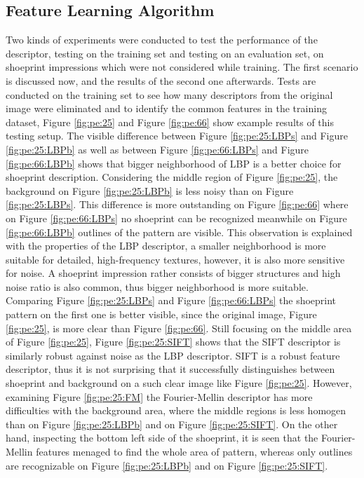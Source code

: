 \documentclass[draft,final]{vutinfth} %
\begin{document}
\subsection{Feature Learning Algorithm}
\par
Two kinds of experiments were conducted to test the performance of the descriptor, testing on the training set and testing on an evaluation set, on shoeprint impressions which were not considered while training.
The first scenario is discussed now, and the results of the second one afterwards.
Tests are conducted on the training set to see how many descriptors from the original image were eliminated and to identify the common features in the training dataset, Figure \ref{fig:pe:25} and Figure \ref{fig:pe:66} show example results of this testing setup.
The visible difference between Figure \ref{fig:pe:25:LBPs} and Figure \ref{fig:pe:25:LBPb} as well as between Figure \ref{fig:pe:66:LBPs} and Figure \ref{fig:pe:66:LBPb} shows that bigger neighborhood of LBP is a better choice for shoeprint description.
Considering the middle region of Figure \ref{fig:pe:25}, the background on Figure \ref{fig:pe:25:LBPb} is less noisy than on Figure \ref{fig:pe:25:LBPs}.
This difference is more outstanding on  Figure \ref{fig:pe:66} where on Figure \ref{fig:pe:66:LBPs} no shoeprint can be recognized meanwhile on Figure \ref{fig:pe:66:LBPb} outlines of the pattern are visible.
This observation is explained with the properties of the LBP descriptor, a smaller neighborhood is more suitable for detailed, high-frequency textures, however, it is also more sensitive for noise.
A shoeprint impression rather consists of bigger structures and high noise ratio is also common, thus bigger neighborhood is more suitable.
Comparing Figure \ref{fig:pe:25:LBPs} and Figure \ref{fig:pe:66:LBPs} the shoeprint pattern on the first one is better visible, since the original image, Figure \ref{fig:pe:25}, is more clear than Figure \ref{fig:pe:66}.
Still focusing on the middle area of Figure \ref{fig:pe:25}, Figure \ref{fig:pe:25:SIFT} shows that the SIFT descriptor is similarly robust against noise as the LBP descriptor.
SIFT is a robust feature descriptor, thus it is not surprising that it successfully distinguishes between shoeprint and background on a such clear image like Figure \ref{fig:pe:25}.
However, examining Figure  \ref{fig:pe:25:FM} the Fourier-Mellin descriptor has more difficulties with the background area, where the middle regions is less homogen than on  Figure \ref{fig:pe:25:LBPb} and on Figure \ref{fig:pe:25:SIFT}.
On the other hand, inspecting the bottom left side of the shoeprint, it is seen that the Fourier-Mellin features menaged to find the whole area of pattern, whereas only outlines are recognizable on Figure \ref{fig:pe:25:LBPb} and on Figure \ref{fig:pe:25:SIFT}.
\end{document}
